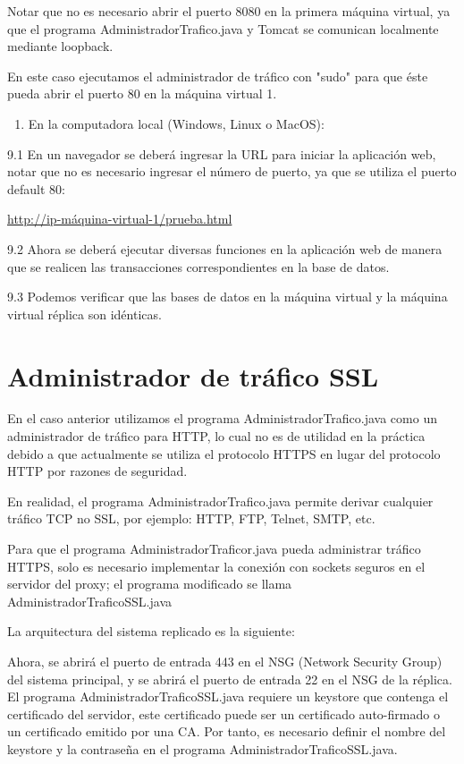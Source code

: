 Notar que no es necesario abrir el puerto 8080 en la primera máquina virtual, ya que el programa AdministradorTrafico.java y Tomcat se comunican localmente mediante loopback.

En este caso ejecutamos el administrador de tráfico con "sudo" para que éste pueda abrir el puerto 80 en la máquina virtual 1.

\begin{enumerate}
\item En la computadora local (Windows, Linux o MacOS):
\end{enumerate}

9.1 En un navegador se deberá ingresar la URL para iniciar la aplicación web, notar que no es necesario ingresar el número de puerto, ya que se utiliza el puerto default 80:

\url{http://ip-máquina-virtual-1/prueba.html}

9.2 Ahora se deberá ejecutar diversas funciones en la aplicación web de manera que se realicen las transacciones correspondientes en la base de datos.

9.3 Podemos verificar que las bases de datos en la máquina virtual y la máquina virtual réplica son idénticas.

\section{Administrador de tráfico SSL}

En el caso anterior utilizamos el programa AdministradorTrafico.java como un administrador de tráfico para HTTP, lo cual no es de utilidad en la práctica debido a que actualmente se utiliza el protocolo HTTPS en lugar del protocolo HTTP por razones de seguridad.

En realidad, el programa AdministradorTrafico.java permite derivar cualquier tráfico TCP no SSL, por ejemplo: HTTP, FTP, Telnet, SMTP, etc.

Para que el programa AdministradorTraficor.java pueda administrar tráfico HTTPS, solo es necesario implementar la conexión con sockets seguros en el servidor del proxy; el programa modificado se llama AdministradorTraficoSSL.java

La arquitectura del sistema replicado es la siguiente:

Ahora, se abrirá el puerto de entrada 443 en el NSG (Network Security Group) del sistema principal, y se abrirá el puerto de entrada 22 en el NSG de la réplica. El programa AdministradorTraficoSSL.java requiere un keystore que contenga el certificado del servidor, este certificado puede ser un certificado auto-firmado o un certificado emitido por una CA. Por tanto, es necesario definir el nombre del keystore y la contraseña en el programa AdministradorTraficoSSL.java.

